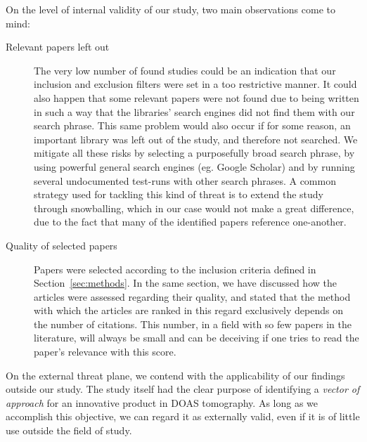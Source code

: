 On the level of internal validity of our study, two main observations
come to mind:
\begin{description}
    
    \item[Relevant papers left out] The very low number of found studies
        could be an indication that our inclusion and exclusion filters
        were set in a too restrictive manner. It could also happen that
        some relevant papers were not found due to being written in such
        a way that the libraries' search engines did not find them with
        our search phrase. This same problem would also occur if for
        some reason, an important library was left out of the study, and
        therefore not searched. We mitigate all these risks by selecting
        a purposefully broad search phrase, by using powerful general
        search engines (eg.  Google Scholar) and by running several
        undocumented test-runs with other search phrases. A common
        strategy used for tackling this kind of threat is to extend the
        study through snowballing, which in our case would not make a
        great difference, due to the fact that many of the identified
        papers reference one-another.
    
    \item[Quality of selected papers] Papers were selected according to
        the inclusion criteria defined in Section~\ref{sec:methods}.  In
        the same section, we have discussed how the articles were
        assessed regarding their quality, and stated that the method
        with which the articles are ranked in this regard exclusively
        depends on the number of citations. This number, in a field with
        so few papers in the literature, will always be small and can be
        deceiving if one tries to read the paper's relevance with this
        score. 

\end{description}

On the external threat plane, we contend with the applicability of our
findings outside our study. The study itself had the clear purpose of
identifying a \emph{vector of approach} for an innovative product in
DOAS tomography. As long as we accomplish this objective, we can regard
it as externally valid, even if it is of little use outside the field of
study.

